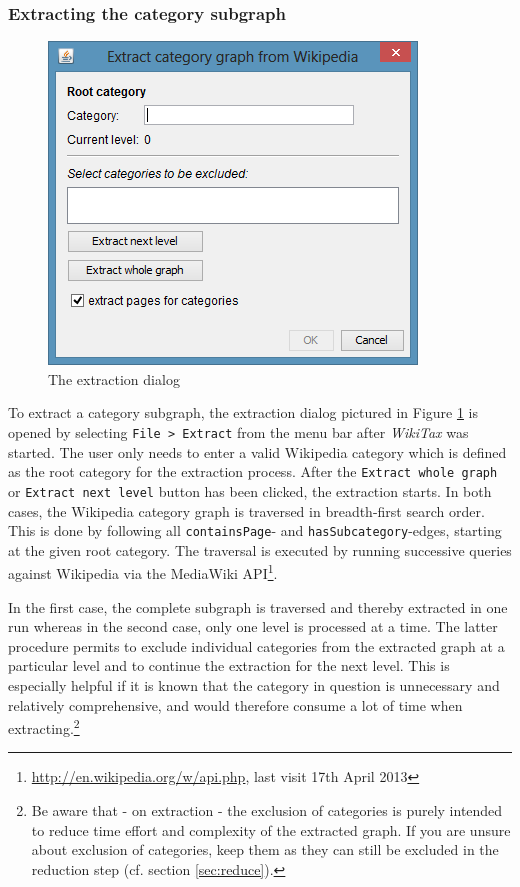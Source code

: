 \documentclass{scrartcl}
\begin{document}
\subsubsection{Extracting the category subgraph}

\begin{figure}[ht]
  \centering
  \includegraphics[scale=0.60]{figures/extraction_dialog.png}
  \caption{The extraction dialog}
  \label{fig:extaction_dialog}
\end{figure}

To extract a category subgraph, the extraction dialog pictured in Figure \ref{fig:extaction_dialog} is opened by selecting \texttt{File > Extract} from the menu bar after \emph{WikiTax} was started. The user only needs to enter a valid Wikipedia category which is defined as the root category for the extraction process. After the \texttt{Extract whole graph} or \texttt{Extract next level} button has been clicked, the extraction starts. In both cases, the Wikipedia category graph is traversed in breadth-first search order. This is done by following all \texttt{containsPage}- and \texttt{hasSubcategory}-edges, starting at the given root category. The traversal is executed by running successive queries against Wikipedia via the MediaWiki API\footnote{\url{http://en.wikipedia.org/w/api.php}, last visit 17th April 2013}.

In the first case, the complete subgraph is traversed and thereby extracted in one run whereas in the second case, only one level is processed at a time. The latter procedure permits to exclude individual categories from the extracted graph at a particular level and to continue the extraction for the next level. This is especially helpful if it is known that the category in question is unnecessary and relatively comprehensive, and would therefore consume a lot of time when extracting.\footnote{Be aware that - on extraction - the exclusion of categories is purely intended to reduce time effort and complexity of the extracted graph. If you are unsure about exclusion of categories, keep them as they can still be excluded in the reduction step (cf. section \ref{sec:reduce}).} 
\end{document}
